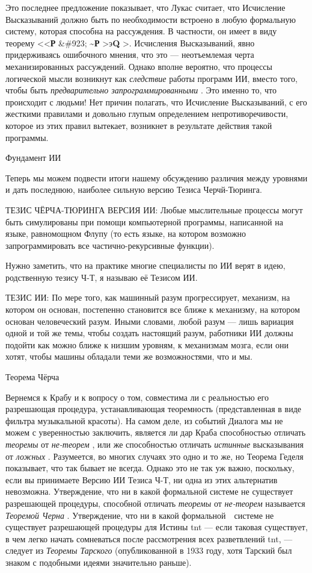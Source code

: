 \documentclass[../main.tex]{subfiles}
\begin{document}
Это последнее предложение показывает, что Лукас считает, что Исчисление Высказываний должно быть по необходимости встроено в любую формальную систему, которая способна на рассуждения. В частности, он имеет в виду теорему \textless\textless{}\textbf{Р} \&\#923; \textbf{\textasciitilde Р} \textgreater э\textbf{Q} \textgreater. Исчисления Высказываний, явно придерживаясь ошибочного мнения, что это --- неотъемлемая черта механизированных рассуждений. Однако вполне вероятно, что процессы логической мысли возникнут как \emph{следствие} работы программ ИИ, вместо того, чтобы быть \emph{предварительно запрограммированными} . Это именно то, что происходит с людьми! Нет причин полагать, что Исчисление Высказываний, с его жесткими правилами и довольно глупым определением непротиворечивости, которое из этих правил вытекает, возникнет в результате действия такой программы.

Фундамент ИИ

Теперь мы можем подвести итоги нашему обсуждению различия между уровнями и дать последнюю, наиболее сильную версию Тезиса Черчй-Тюринга.

ТЕЗИС ЧЁРЧА-ТЮРИНГА ВЕРСИЯ ИИ: Любые мыслительные процессы могут быть симулированы при помощи компьютерной программы, написанной на языке, равномощном Флупу (то есть языке, на котором возможно запрограммировать все частично-рекурсивные функции).

Нужно заметить, что на практике многие специалисты по ИИ верят в идею, родственную тезису Ч-Т, я называю её Тезисом ИИ.

ТЕЗИС ИИ: По мере того, как машинный разум прогрессирует, механизм, на котором он основан, постепенно становится все ближе к механизму, на котором основан человеческий разум. Иными словами, любой разум --- лишь вариация одной и той же темы, чтобы создать настоящий разум, работники ИИ должны подойти как можно ближе к низшим уровням, к механизмам мозга, если они хотят, чтобы машины обладали теми же возможностями, что и мы.

Теорема Чёрча

Вернемся к Крабу и к вопросу о том, совместима ли с реальностью его разрешающая процедура, устанавливающая теоремность (представленная в виде фильтра музыкальной красоты). На самом деле, из событий Диалога мы не можем с уверенностью заключить, является ли дар Краба способностью отличать \emph{теоремы} от \emph{не-теорем} , или же способностью отличать \emph{истинные} высказывания от \emph{ложных} . Разумеется, во многих случаях это одно и то же, но Теорема Геделя показывает, что так бывает не всегда. Однако это не так уж важно, поскольку, если вы принимаете Версию ИИ Тезиса Ч-Т, ни одна из этих альтернатив невозможна. Утверждение, что ни в какой формальной системе не существует разрешающей процедуры, способной отличать \emph{теоремы} от \emph{не-теорем} называется \emph{Теоремой Черна} . Утверждение, что ни в какой формальной~~системе не существует разрешающей процедуры для Истины \acs{tnt} --- если таковая существует, в чем легко начать сомневаться после рассмотрения всех разветвлений \acs{tnt}, --- следует из \emph{Теоремы Тарского} (опубликованной в 1933 году, хотя Тарский был знаком с подобными идеями значительно раньше).
\end{document}
